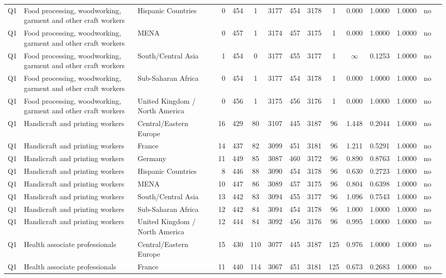 \begin{longtable}{lllrcccccccccll}
Q1 & Food processing, woodworking, garment and other craft workers & Hispanic Countries & 0 & 454 & 1 & 3177 & 454 & 3178 & 1 & 0.000 & 1.0000 & 1.0000 & no \\
Q1 & Food processing, woodworking, garment and other craft workers & MENA & 0 & 457 & 1 & 3174 & 457 & 3175 & 1 & 0.000 & 1.0000 & 1.0000 & no \\
Q1 & Food processing, woodworking, garment and other craft workers & South/Central Asia & 1 & 454 & 0 & 3177 & 455 & 3177 & 1 & $\infty$ & 0.1253 & 1.0000 & no \\
Q1 & Food processing, woodworking, garment and other craft workers & Sub-Saharan Africa & 0 & 454 & 1 & 3177 & 454 & 3178 & 1 & 0.000 & 1.0000 & 1.0000 & no \\
Q1 & Food processing, woodworking, garment and other craft workers & United Kingdom / North America & 0 & 456 & 1 & 3175 & 456 & 3176 & 1 & 0.000 & 1.0000 & 1.0000 & no \\
Q1 & Handicraft and printing workers & Central/Eastern Europe & 16 & 429 & 80 & 3107 & 445 & 3187 & 96 & 1.448 & 0.2044 & 1.0000 & no \\
Q1 & Handicraft and printing workers & France & 14 & 437 & 82 & 3099 & 451 & 3181 & 96 & 1.211 & 0.5291 & 1.0000 & no \\
Q1 & Handicraft and printing workers & Germany & 11 & 449 & 85 & 3087 & 460 & 3172 & 96 & 0.890 & 0.8763 & 1.0000 & no \\
Q1 & Handicraft and printing workers & Hispanic Countries & 8 & 446 & 88 & 3090 & 454 & 3178 & 96 & 0.630 & 0.2723 & 1.0000 & no \\
Q1 & Handicraft and printing workers & MENA & 10 & 447 & 86 & 3089 & 457 & 3175 & 96 & 0.804 & 0.6398 & 1.0000 & no \\
Q1 & Handicraft and printing workers & South/Central Asia & 13 & 442 & 83 & 3094 & 455 & 3177 & 96 & 1.096 & 0.7543 & 1.0000 & no \\
Q1 & Handicraft and printing workers & Sub-Saharan Africa & 12 & 442 & 84 & 3094 & 454 & 3178 & 96 & 1.000 & 1.0000 & 1.0000 & no \\
Q1 & Handicraft and printing workers & United Kingdom / North America & 12 & 444 & 84 & 3092 & 456 & 3176 & 96 & 0.995 & 1.0000 & 1.0000 & no \\
Q1 & Health associate professionals & Central/Eastern Europe & 15 & 430 & 110 & 3077 & 445 & 3187 & 125 & 0.976 & 1.0000 & 1.0000 & no \\
Q1 & Health associate professionals & France & 11 & 440 & 114 & 3067 & 451 & 3181 & 125 & 0.673 & 0.2683 & 1.0000 & no \\

\end{longtable}
